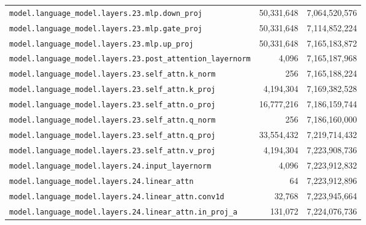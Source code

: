 \documentclass[10pt,a4paper]{article}
\theoremstyle{definition}
\begin{document}
\begin{appendices}
\begin{longtable}{p{9.5cm}rr}
\texttt{model.\allowbreak{}language\_model.\allowbreak{}layers.\allowbreak{}23.\allowbreak{}mlp.\allowbreak{}down\_proj} & 50,331,648 & 7,064,520,576 \\
\texttt{model.\allowbreak{}language\_model.\allowbreak{}layers.\allowbreak{}23.\allowbreak{}mlp.\allowbreak{}gate\_proj} & 50,331,648 & 7,114,852,224 \\
\texttt{model.\allowbreak{}language\_model.\allowbreak{}layers.\allowbreak{}23.\allowbreak{}mlp.\allowbreak{}up\_proj} & 50,331,648 & 7,165,183,872 \\
\texttt{model.\allowbreak{}language\_model.\allowbreak{}layers.\allowbreak{}23.\allowbreak{}post\_attention\_layernorm} & 4,096 & 7,165,187,968 \\
\texttt{model.\allowbreak{}language\_model.\allowbreak{}layers.\allowbreak{}23.\allowbreak{}self\_attn.\allowbreak{}k\_norm} & 256 & 7,165,188,224 \\
\texttt{model.\allowbreak{}language\_model.\allowbreak{}layers.\allowbreak{}23.\allowbreak{}self\_attn.\allowbreak{}k\_proj} & 4,194,304 & 7,169,382,528 \\
\texttt{model.\allowbreak{}language\_model.\allowbreak{}layers.\allowbreak{}23.\allowbreak{}self\_attn.\allowbreak{}o\_proj} & 16,777,216 & 7,186,159,744 \\
\texttt{model.\allowbreak{}language\_model.\allowbreak{}layers.\allowbreak{}23.\allowbreak{}self\_attn.\allowbreak{}q\_norm} & 256 & 7,186,160,000 \\
\texttt{model.\allowbreak{}language\_model.\allowbreak{}layers.\allowbreak{}23.\allowbreak{}self\_attn.\allowbreak{}q\_proj} & 33,554,432 & 7,219,714,432 \\
\texttt{model.\allowbreak{}language\_model.\allowbreak{}layers.\allowbreak{}23.\allowbreak{}self\_attn.\allowbreak{}v\_proj} & 4,194,304 & 7,223,908,736 \\
\texttt{model.\allowbreak{}language\_model.\allowbreak{}layers.\allowbreak{}24.\allowbreak{}input\_layernorm} & 4,096 & 7,223,912,832 \\
\texttt{model.\allowbreak{}language\_model.\allowbreak{}layers.\allowbreak{}24.\allowbreak{}linear\_attn} & 64 & 7,223,912,896 \\
\texttt{model.\allowbreak{}language\_model.\allowbreak{}layers.\allowbreak{}24.\allowbreak{}linear\_attn.\allowbreak{}conv1d} & 32,768 & 7,223,945,664 \\
\texttt{model.\allowbreak{}language\_model.\allowbreak{}layers.\allowbreak{}24.\allowbreak{}linear\_attn.\allowbreak{}in\_proj\_a} & 131,072 & 7,224,076,736 \\

\end{longtable}
\end{appendices}
\end{document}
